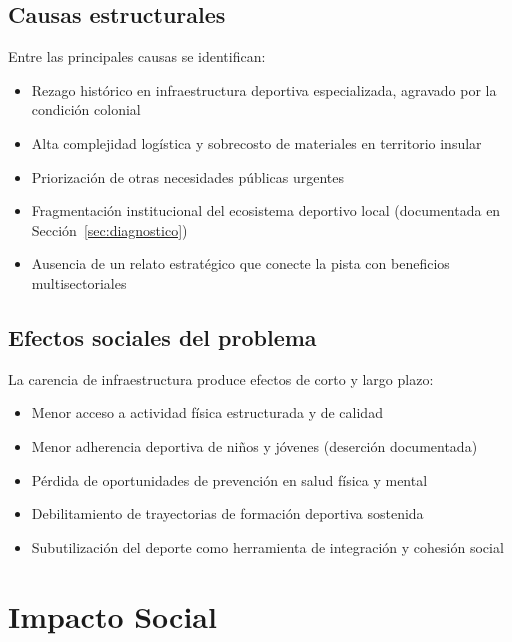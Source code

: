\documentclass[12pt, a4paper]{article}
\begin{document}
\subsection{Causas estructurales}

Entre las principales causas se identifican:

\begin{itemize}[leftmargin=*, itemsep=3pt]
  \item Rezago histórico en infraestructura deportiva especializada, agravado por la condición colonial
  \item Alta complejidad logística y sobrecosto de materiales en territorio insular
  \item Priorización de otras necesidades públicas urgentes
  \item Fragmentación institucional del ecosistema deportivo local (documentada en Sección~\ref{sec:diagnostico})
  \item Ausencia de un relato estratégico que conecte la pista con beneficios multisectoriales
\end{itemize}

\subsection{Efectos sociales del problema}

La carencia de infraestructura produce efectos de corto y largo plazo:

\begin{itemize}[leftmargin=*, itemsep=3pt]
  \item Menor acceso a actividad física estructurada y de calidad
  \item Menor adherencia deportiva de niños y jóvenes (deserción documentada)
  \item Pérdida de oportunidades de prevención en salud física y mental
  \item Debilitamiento de trayectorias de formación deportiva sostenida
  \item Subutilización del deporte como herramienta de integración y cohesión social
\end{itemize}

\section{Impacto Social}
\end{document}

